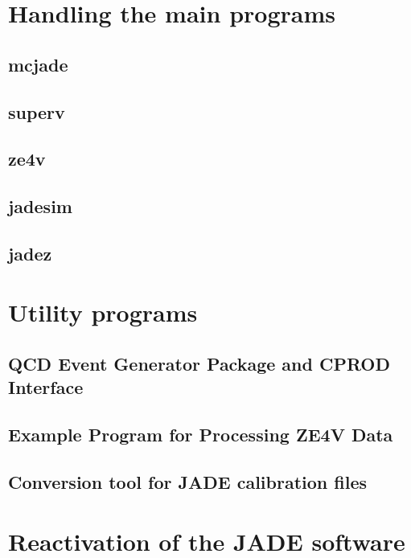 \section{Handling the main programs}


\subsection{mcjade}



\subsection{superv}



\subsection{ze4v}


\subsection{jadesim}


\subsection{jadez}


\section{Utility programs}



\subsection{QCD Event Generator Package and CPROD Interface}


\subsection{Example Program for Processing ZE4V Data}


\subsection{Conversion tool for JADE calibration files}


\section{Reactivation of the JADE software}





